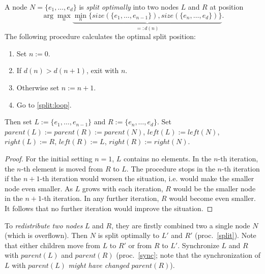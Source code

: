 \documentclass{vldb}
\begin{document}
\begin{proc} \label{split}
A node \mbox{$N = \{ e_1, \ldots, e_d \}$} is {\em split optimally} into two
nodes $L$ and $R$ at position
\[ \arg \max_n \underbrace{\min_n \{ size(\{e_1, \ldots, e_{n-1}\}),
    size(\{e_n, \ldots, e_d\}) \}}_{=: d(n)}. \]
The following procedure calculates the optimal split position:
\begin{enumerate}
\item Set \mbox{$n := 0$}.
\item \label{split:loop} If \mbox{$d(n) > d(n+1)$}, exit with $n$.
\item Otherwise set \mbox{$n := n + 1$}. 
\item Go to \ref{split:loop}.
\end{enumerate}
Then set \mbox{$L := \{e_1, \ldots, e_{n-1}\}$}
and \mbox{$R := \{e_n, \ldots, e_d\}$}.
Set \mbox{$parent(L) := parent(R) := parent(N)$}, \mbox{$left(L) := left(N)$},
\mbox{$right(L) := R$}, \mbox{$left(R) := L$}, \mbox{$right(R) := right(N)$}.
\end{proc}

\begin{proof}
For the initial setting $n = 1$, $L$ contains no elements.
In the $n$-th iteration, the $n$-th element is moved from $R$ to $L$.
The procedure stops in the $n$-th iteration if the $n+1$-th iteration would
worsen the situation, i.e. would make the smaller node even smaller.
As $L$ grows with each iteration, $R$ would be the smaller node in the
$n+1$-th iteration. In any further iteration, $R$ would become even smaller.
It follows that no further iteration would improve the situation.
\end{proof}


\begin{proc} \label{dist}
To {\em redistribute two nodes} $L$ and $R$, they are firstly combined two
a single node $N$ (which is overflown).
Then $N$ is split optimally to $L'$ and $R'$ (proc.~\ref{split}).
Note that either children move from $L$ to $R'$ or from $R$ to $L'$.
Synchronize $L$ and $R$ with $parent(L)$ and $parent(R)$ (proc.~\ref{sync};
note that the synchronization of $L$ with $parent(L)$ {\em might have changed}
$parent(R)$).
\end{proc}
\end{document}
